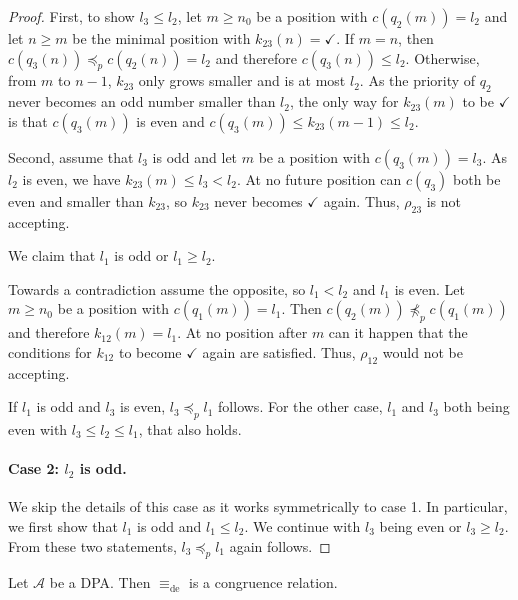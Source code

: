 \begin{proof}
	First, to show $l_3 \leq l_2$, let $m \geq n_0$ be a position with $c(q_2(m)) = l_2$ and let $n \geq m$ be the minimal position with $k_{23}(n) = \checkmark$. If $m = n$, then $c(q_3(n)) \preceq_p c(q_2(n)) = l_2$ and therefore $c(q_3(n)) \leq l_2$. Otherwise, from $m$ to $n-1$, $k_{23}$ only grows smaller and is at most $l_2$. As the priority of $q_2$ never becomes an odd number smaller than $l_2$, the only way for $k_{23}(m)$ to be $\checkmark$ is that $c(q_3(m))$ is even and $c(q_3(m)) \leq k_{23}(m-1) \leq l_2$.
	
	Second, assume that $l_3$ is odd and let $m$ be a position with $c(q_3(m)) = l_3$. As $l_2$ is even, we have $k_{23}(m) \leq l_3 < l_2$. At no future position can $c(q_3)$ both be even and smaller than $k_{23}$, so $k_{23}$ never becomes $\checkmark$ again. Thus, $\rho_{23}$ is not accepting.
	
	We claim that $l_1$ is odd or $l_1 \geq l_2$.
	
	Towards a contradiction assume the opposite, so $l_1 < l_2$ and $l_1$ is even. Let $m \geq n_0$ be a position with $c(q_1(m)) = l_1$. Then $c(q_2(m)) \not\preceq_p c(q_1(m))$ and therefore $k_{12}(m) = l_1$. At no position after $m$ can it happen that the conditions for $k_{12}$ to become $\checkmark$ again are satisfied. Thus, $\rho_{12}$ would not be accepting.
	
	If $l_1$ is odd and $l_3$ is even, $l_3 \preceq_p l_1$ follows. For the other case, $l_1$ and $l_3$ both being even with $l_3 \leq l_2 \leq l_1$, that also holds.
	
	\paragraph{Case 2: $l_2$ is odd.} We skip the details of this case as it works symmetrically to case 1. In particular, we first show that $l_1$ is odd and $l_1 \leq l_2$. We continue with $l_3$ being even or $l_3 \geq l_2$. From these two statements, $l_3 \preceq_p l_1$ again follows.
\end{proof}

\begin{theorem}
	Let $\mathcal{A}$ be a DPA. Then $\equiv_\text{de}$ is a congruence relation.
\end{theorem}

